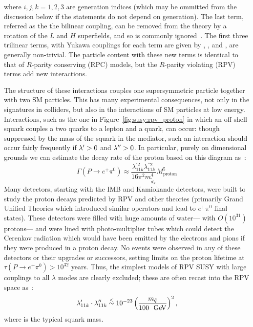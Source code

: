 \noindent where $i,j,k=1,2,3$ are generation indices (which may be ommitted from the discussion below if the statements do not depend on generation). The last term, referred as the the bilinear coupling, can be removed from the theory by a rotation of the $L$ and $H$ superfields, and so is commonly ignored~\cite{dreinerRPV}. The first three trilinear terms, with Yukawa couplings for each term are given by \lam, \lamp, and \lampp, are generally non-trivial. The particle content with these new terms is identical to that of $R$-parity conserving (RPC) models, but the $R$-parity violating (RPV) terms add new interactions.

The structure of these interactions couples one supersymmetric particle together with two SM particles. This has many experimental consequences, not only in the signatures in colliders, but also in the interactions of SM particles at low energy. Interactions, such as the one in Figure~\ref{fig:susy:rpv_proton} in which an off-shell squark couples a two quarks to a lepton and a quark, can occur: though suppressed by the mass of the squark in the mediator, such an interaction should occur fairly frequently if $\lambda^{\prime} > 0$ and $\lambda^{\prime\prime} > 0$. In particular, purely on dimensional grounds we can estimate the decay rate of the proton based on this diagram as~\cite{dreinerRPV}:
%
\begin{equation}
\Gamma(P\rightarrow e^+ \pi^0) \approx \frac{\lambda_{11k}^{'2} \lambda_{11k}^{''2}}{16\pi^2 m^4_{\tilde{d}_k}} M_\mathrm{proton}^5
\end{equation} 
%
Many detectors, starting with the IMB and Kamiokande detectors, were built to study the proton decays predicted by RPV and other theories (primarily Grand Unified Theories which introduced similar operators and lead to $e^+ \pi^0$ final states). These detectors were filled with huge amounts of water--- with $O(10^{31})$ protons--- and were lined with photo-multiplier tubes which could detect the Cerenkov radiation which would have been emitted by the electrons and pions if they were produced in a proton decay. No events were observed in any of these detectors or their upgrades or successors, setting limits on the proton lifetime at $\tau(P\rightarrow e^+ \pi^0) > 10^{32}$ years. Thus, the simplest models of RPV SUSY with large couplings to all $\lambda$ modes are clearly excluded; these are often recast into the RPV space as~\cite{PhysRevD.47.279}:
%
\begin{eqnarray}
  \lamp_{11k}\cdot\lampp_{11k}\; \lsim\; 10^{-23} \left( \frac{{\msquark}} {100~\gev} \right)^2,
  \label{eqn:rpvandudd:protondecay}
\end{eqnarray}
%
where \msquark is the typical squark mass. 

